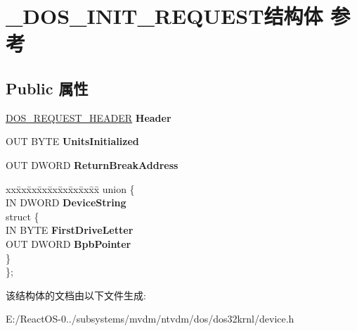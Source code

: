 \hypertarget{struct___d_o_s___i_n_i_t___r_e_q_u_e_s_t}{}\section{\+\_\+\+D\+O\+S\+\_\+\+I\+N\+I\+T\+\_\+\+R\+E\+Q\+U\+E\+S\+T结构体 参考}
\label{struct___d_o_s___i_n_i_t___r_e_q_u_e_s_t}
\subsection*{Public 属性}
\begin{DoxyCompactItemize}
\item 
\mbox{\label{struct___d_o_s___i_n_i_t___r_e_q_u_e_s_t_aa6a830494e7a5b0edec60506539449e9}} 
\hyperlink{struct___d_o_s___r_e_q_u_e_s_t___h_e_a_d_e_r}{D\+O\+S\+\_\+\+R\+E\+Q\+U\+E\+S\+T\+\_\+\+H\+E\+A\+D\+ER} {\bfseries Header}
\item 
\mbox{\label{struct___d_o_s___i_n_i_t___r_e_q_u_e_s_t_a4ce00ccd77d43904f74241c392777142}} 
O\+UT B\+Y\+TE {\bfseries Units\+Initialized}
\item 
\mbox{\label{struct___d_o_s___i_n_i_t___r_e_q_u_e_s_t_a86199ea75655cf43aaa6036ac4830da0}} 
O\+UT D\+W\+O\+RD {\bfseries Return\+Break\+Address}
\item 
\mbox{\label{struct___d_o_s___i_n_i_t___r_e_q_u_e_s_t_a8f40c4ed7e396796c42f877c22a9b957}} 
\begin{tabbing}
xx\=xx\=xx\=xx\=xx\=xx\=xx\=xx\=xx\=\kill
union \{\\
\>IN DWORD {\bfseries DeviceString}\\
\mbox{\label{union___d_o_s___i_n_i_t___r_e_q_u_e_s_t_1_1_0D3706_a1b71d5775c101984208a15370b6b73c9}} 
\>struct \{\\
\>\>IN BYTE {\bfseries FirstDriveLetter}\\
\>\>OUT DWORD {\bfseries BpbPointer}\\
\>\} \\
\}; \\

\end{tabbing}\end{DoxyCompactItemize}


该结构体的文档由以下文件生成\+:\begin{DoxyCompactItemize}
\item 
E\+:/\+React\+O\+S-\/0../subsystems/mvdm/ntvdm/dos/dos32krnl/device.\+h\end{DoxyCompactItemize}
